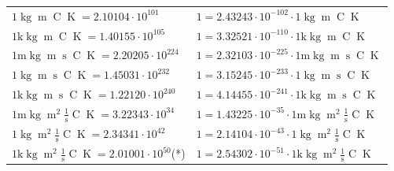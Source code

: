 \begin{center}
\begin{longtable}{l l}
{\color{black}$1 \bm{\mathrm{ }}\operatorname{kg}{\operatorname{m}}{}{\operatorname{C}}{\operatorname{K}} = 2.10104\cdot10^{101} $}   & {\color{black}$ 1 = 2.43243\cdot10^{-102} \cdot 1 \bm{\mathrm{ }}\operatorname{kg}{\operatorname{m}}{}{\operatorname{C}}{\operatorname{K}}$}  \\
{\color{gray}$1 \bm{\mathrm{ k}}\operatorname{kg}{\operatorname{m}}{}{\operatorname{C}}{\operatorname{K}} = 1.40155\cdot10^{105} $}   & {\color{gray}$ 1 = 3.32521\cdot10^{-110} \cdot 1 \bm{\mathrm{ k}}\operatorname{kg}{\operatorname{m}}{}{\operatorname{C}}{\operatorname{K}}$}  \\
{\color{gray}$1 \bm{\mathrm{ m}}\operatorname{kg}{\operatorname{m}}{\operatorname{s}}{\operatorname{C}}{\operatorname{K}} = 2.20205\cdot10^{224} $}   & {\color{gray}$ 1 = 2.32103\cdot10^{-225} \cdot 1 \bm{\mathrm{ m}}\operatorname{kg}{\operatorname{m}}{\operatorname{s}}{\operatorname{C}}{\operatorname{K}}$}  \\
{\color{black}$1 \bm{\mathrm{ }}\operatorname{kg}{\operatorname{m}}{\operatorname{s}}{\operatorname{C}}{\operatorname{K}} = 1.45031\cdot10^{232} $}   & {\color{black}$ 1 = 3.15245\cdot10^{-233} \cdot 1 \bm{\mathrm{ }}\operatorname{kg}{\operatorname{m}}{\operatorname{s}}{\operatorname{C}}{\operatorname{K}}$}  \\
{\color{gray}$1 \bm{\mathrm{ k}}\operatorname{kg}{\operatorname{m}}{\operatorname{s}}{\operatorname{C}}{\operatorname{K}} = 1.22120\cdot10^{240} $}   & {\color{gray}$ 1 = 4.14455\cdot10^{-241} \cdot 1 \bm{\mathrm{ k}}\operatorname{kg}{\operatorname{m}}{\operatorname{s}}{\operatorname{C}}{\operatorname{K}}$}  \\
{\color{gray}$1 \bm{\mathrm{ m}}\operatorname{kg}{\operatorname{m}^2}\frac1{\operatorname{s}}{\operatorname{C}}{\operatorname{K}} = 3.22343\cdot10^{34} $}   & {\color{gray}$ 1 = 1.43225\cdot10^{-35} \cdot 1 \bm{\mathrm{ m}}\operatorname{kg}{\operatorname{m}^2}\frac1{\operatorname{s}}{\operatorname{C}}{\operatorname{K}}$}  \\
{\color{black}$1 \bm{\mathrm{ }}\operatorname{kg}{\operatorname{m}^2}\frac1{\operatorname{s}}{\operatorname{C}}{\operatorname{K}} = 2.34341\cdot10^{42} $}   & {\color{black}$ 1 = 2.14104\cdot10^{-43} \cdot 1 \bm{\mathrm{ }}\operatorname{kg}{\operatorname{m}^2}\frac1{\operatorname{s}}{\operatorname{C}}{\operatorname{K}}$}  \\
{\color{gray}$1 \bm{\mathrm{ k}}\operatorname{kg}{\operatorname{m}^2}\frac1{\operatorname{s}}{\operatorname{C}}{\operatorname{K}} = 2.01001\cdot10^{50} $}\quad(*) & {\color{gray}$ 1 = 2.54302\cdot10^{-51} \cdot 1 \bm{\mathrm{ k}}\operatorname{kg}{\operatorname{m}^2}\frac1{\operatorname{s}}{\operatorname{C}}{\operatorname{K}}$}  \\

\end{longtable}
\end{center}
